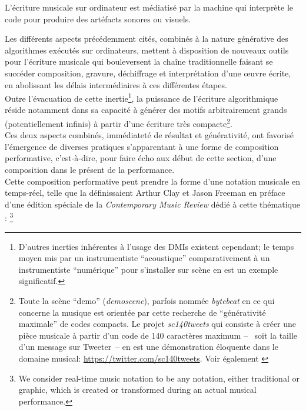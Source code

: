 L'écriture musicale sur ordinateur est médiatisé par la machine qui interprète le code pour produire des artéfacts sonores ou visuels.

Les différents aspects précédemment cités, combinés à la nature générative des algorithmes exécutés sur ordinateurs, mettent à disposition de nouveaux outils pour l'écriture musicale qui bouleversent la chaîne traditionnelle faisant se succéder composition, gravure, déchiffrage et interprétation d'une œuvre écrite, en abolissant les délais intermédiaires à ces différentes étapes.\\
\indent Outre l'évacuation de cette inertie\footnote{D'autres inerties inhérentes à l'usage des \glspl{DMI} existent cependant; le temps moyen mis par un instrumentiste ``acoustique'' comparativement à un instrumentiste ``numérique'' pour s'installer sur scène en est un exemple significatif.}, la puissance de l'écriture algorithmique réside notamment dans sa capacité à générer des motifs arbitrairement grands (potentiellement infinis) à partir d'une écriture très compacte\footnote{Toute la scène ``demo'' (\textit{demoscene}), parfois nommée \textit{bytebeat} en ce qui concerne la musique est orientée par cette recherche de ``générativité maximale'' de codes compacts. Le projet \textit{sc140tweets} qui consiste à créer une pièce musicale à partir d'un code de 140 caractères maximum --~ soit la taille d'un message sur Tweeter~-- en est une démonstration éloquente dans le domaine musical: \url{https://twitter.com/sc140tweets}. Voir également \cite{heikkila_discovering_2011}}.\\
\indent Ces deux aspects combinés, immédiateté de résultat et générativité, ont favorisé l'émergence de diverses pratiques s'apparentant à une forme de composition performative, c'est-à-dire, pour faire écho aux début de cette section, d'une composition dans le présent de la performance.\\
\indent Cette composition performative peut prendre la forme d'une notation musicale en temps-réel, telle que la définissaient Arthur Clay et Jason Freeman en préface d'une édition spéciale de la \textit{Contemporary Music Review} dédié à cette thématique \cite{clay_preface_2010}: \footnote{We consider real-time music notation to be any notation, either traditional or graphic, which is created or transformed during an actual musical performance.}\\
